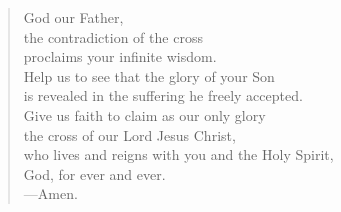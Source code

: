 \prayer

\setlength{\leftmargini}{\prayerleftmargini}

\begin{verse}
God our Father,\\
the contradiction of the cross\\
proclaims your infinite wisdom.\\
Help us to see that the glory of your Son\\
is revealed in the suffering he freely accepted.\\
Give us faith to claim as our only glory\\
the cross of our Lord Jesus Christ,\\
who lives and reigns with you and the Holy Spirit,\\
God, for ever and ever.\\
{\color{red}---\thinspace}Amen.
\end{verse}

\setlength{\leftmargini}{\defleftmargini}